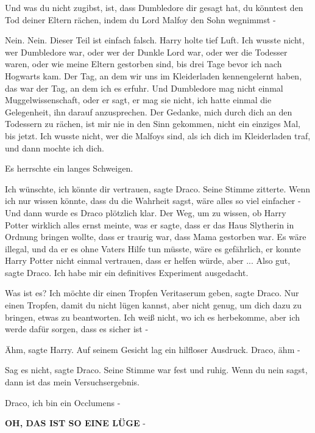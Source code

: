 \glqq{}Und was du nicht zugibst, ist, dass Dumbledore dir gesagt hat, du könntest
den Tod deiner Eltern rächen, indem du Lord Malfoy den Sohn wegnimmst -\grqq{}

\glqq{}Nein. Nein. Dieser Teil ist einfach falsch.\grqq{} Harry holte tief Luft.
\glqq{}Ich wusste nicht, wer Dumbledore war, oder wer der Dunkle Lord war, oder
wer die Todesser waren, oder wie meine Eltern gestorben sind, bis drei Tage
bevor ich nach Hogwarts kam. Der Tag, an dem wir uns im Kleiderladen
kennengelernt haben, das war der Tag, an dem ich es erfuhr. Und Dumbledore mag
nicht einmal Muggelwissenschaft, oder er sagt, er mag sie nicht, ich hatte
einmal die Gelegenheit, ihn darauf anzusprechen. Der Gedanke, mich durch dich an
den Todessern zu rächen, ist mir nie in den Sinn gekommen, nicht ein einziges
Mal, bis jetzt. Ich wusste nicht, wer die Malfoys sind, als ich dich im
Kleiderladen traf, und dann mochte ich dich.\grqq{}

Es herrschte ein langes Schweigen.

\glqq{}Ich wünschte, ich könnte dir vertrauen\grqq{}, sagte Draco. Seine Stimme
zitterte. \glqq{}Wenn ich nur wissen könnte, dass du die Wahrheit sagst, wäre
alles so viel einfacher -\grqq{} Und dann wurde es Draco plötzlich klar. Der
Weg, um zu wissen, ob Harry Potter wirklich alles ernst meinte, was er sagte,
dass er das Haus Slytherin in Ordnung bringen wollte, dass er traurig war, dass
Mama gestorben war. Es wäre illegal, und da er es ohne Vaters Hilfe tun
müsste, wäre es gefährlich, er konnte Harry Potter nicht einmal vertrauen, dass
er helfen würde, aber ... \glqq{}Also gut\grqq{}, sagte Draco. \glqq{}Ich habe mir
ein definitives Experiment ausgedacht.\grqq{}

\glqq{}Was ist es?\grqq{} \glqq{}Ich möchte dir einen Tropfen Veritaserum
geben\grqq{}, sagte Draco. \glqq{}Nur einen Tropfen, damit du nicht lügen kannst,
aber nicht genug, um dich dazu zu bringen, etwas zu beantworten. Ich weiß nicht,
wo ich es herbekomme, aber ich werde dafür sorgen, dass es sicher ist -\grqq{}

\glqq{}Ähm\grqq{}, sagte Harry. Auf seinem Gesicht lag ein hilfloser Ausdruck.
\glqq{}Draco, ähm -\grqq{}

\glqq{}Sag es nicht\grqq{}, sagte Draco. Seine Stimme war fest und ruhig. \glqq{}
Wenn du nein sagst, dann ist das mein Versuchsergebnis.\grqq{}

\glqq{}Draco, ich bin ein Occlumens -\grqq{}

\glqq{}\textbf{OH, DAS IST SO EINE LÜGE} -\grqq{}

